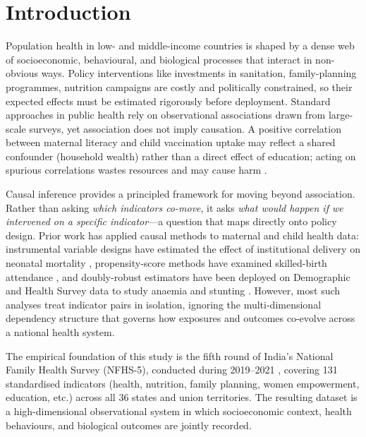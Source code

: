 \documentclass[12pt,a4paper]{report}
\begin{document}
\newpage

\tableofcontents
\newpage
\listoffigures
\listoftables
\newpage

\chapter{Introduction}
\label{chap:intro}

Population health in low- and middle-income countries is shaped by a dense web of
socioeconomic, behavioural, and biological processes that interact in non-obvious
ways.
Policy interventions like investments in sanitation, family-planning programmes,
nutrition campaigns are costly and politically constrained, so their expected
effects must be estimated rigorously before deployment.
Standard approaches in public health rely on observational associations drawn from
large-scale surveys, yet association does not imply causation.
A positive correlation between maternal literacy and child vaccination uptake may
reflect a shared confounder (household wealth) rather than a direct effect of
education; acting on spurious correlations wastes resources and may cause harm
\citep{pearl2009causality,hernan2020causal}.

Causal inference provides a principled framework for moving beyond association.
Rather than asking \emph{which indicators co-move}, it asks \emph{what would happen
if we intervened on a specific indicator}---a question that maps directly onto policy
design.
Prior work has applied causal methods to maternal and child health data:
instrumental variable designs have estimated the effect of institutional delivery
on neonatal mortality \citep{Lim2010}, propensity-score methods have examined
skilled-birth attendance \citep{Bhutta2008}, and doubly-robust estimators have been
deployed on Demographic and Health Survey data to study anaemia and stunting
\citep{Luque2019,Kennedy2020}.
However, most such analyses treat indicator pairs in isolation, ignoring the
multi-dimensional dependency structure that governs how exposures and outcomes
co-evolve across a national health system.

The empirical foundation of this study is the fifth round of India's National Family
Health Survey (NFHS-5), conducted during 2019--2021 \citep{nfhs5report}, covering
131 standardised indicators (health, nutrition, family planning, women empowerment,
education, etc.) across all 36 states and union territories.
The resulting dataset is a high-dimensional observational system in which
socioeconomic context, health behaviours, and biological outcomes are jointly
recorded.
\end{document}
